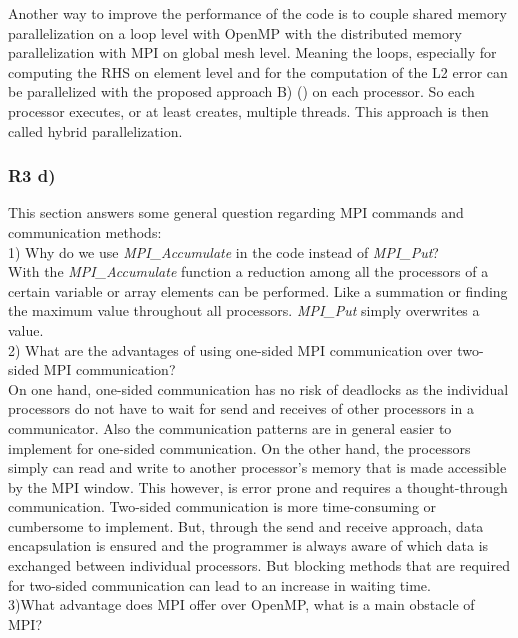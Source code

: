 Another way to improve the performance of the code is to couple shared memory parallelization on a loop level with OpenMP with the distributed memory parallelization with MPI on global mesh level. Meaning the loops, especially for computing the RHS on element level and for the computation of the L2 error can be parallelized with the proposed approach B) () on each processor. So each processor executes, or at least creates, multiple threads. This approach is then called hybrid parallelization.

\subsubsection{R3 d)}

This section answers some general question regarding MPI commands and communication methods:\\

1) Why do we use \textit{MPI\_Accumulate} in the code instead of \textit{MPI\_Put}?\\

With the \textit{MPI\_Accumulate} function a reduction among all the processors of a certain variable or array elements can be performed. Like a summation or finding the maximum value throughout all processors. \textit{MPI\_Put} simply overwrites a value.\\

2) What are the advantages of using one-sided MPI communication over two-sided MPI communication?\\

On one hand, one-sided communication has no risk of deadlocks as the individual processors do not have to wait for send and receives of other processors in a communicator. Also the communication patterns are in general easier to implement for one-sided communication. On the other hand, the processors simply can read and write to another processor's memory that is made accessible by the MPI window. This however, is error prone and requires a thought-through communication. 
Two-sided communication is more time-consuming or cumbersome to implement. But, through the send and receive approach, data encapsulation is ensured and the programmer is always aware of which data is exchanged between individual processors. But blocking methods that are required for two-sided communication can lead to an increase in waiting time.\\

3)What advantage does MPI offer over OpenMP, what is a main obstacle of MPI?\\

